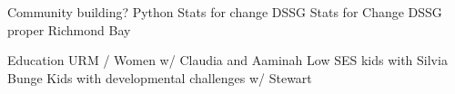 



Community building?
Python
Stats for change
DSSG
Stats for Change
DSSG proper
Richmond Bay

Education
URM / Women w/ Claudia and Aaminah
Low SES kids with Silvia Bunge
Kids with developmental challenges w/ Stewart

